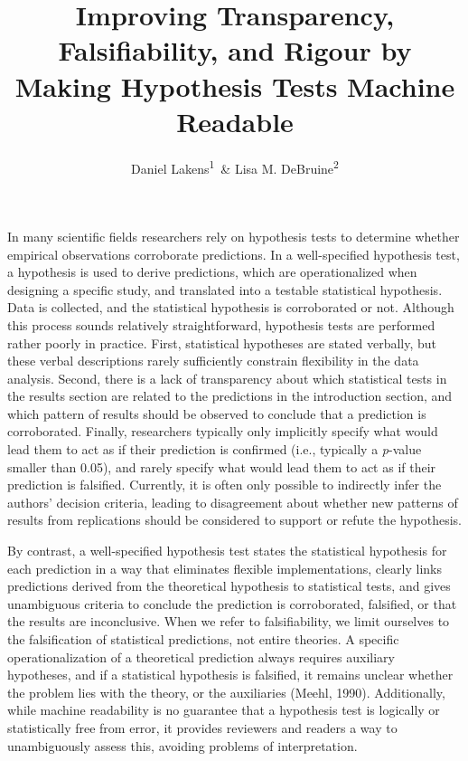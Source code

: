 \documentclass[
  english,
  doc,floatsintext]{apa6}
\author{Daniel Lakens\textsuperscript{1}\ \& Lisa M. DeBruine\textsuperscript{2}}
\affiliation{
\vspace{0.5cm}
\textsuperscript{1} School of Innovation Sciences, Eindhoven University of Technology\\\textsuperscript{2} Institute of Neuroscience and Psychology, University of Glasgow}
\title{Improving Transparency, Falsifiability, and Rigour by Making Hypothesis Tests Machine Readable}
\date{}
\begin{document}
\maketitle

In many scientific fields researchers rely on hypothesis tests to determine whether empirical observations corroborate predictions. In a well-specified hypothesis test, a hypothesis is used to derive predictions, which are operationalized when designing a specific study, and translated into a testable statistical hypothesis. Data is collected, and the statistical hypothesis is corroborated or not. Although this process sounds relatively straightforward, hypothesis tests are performed rather poorly in practice. First, statistical hypotheses are stated verbally, but these verbal descriptions rarely sufficiently constrain flexibility in the data analysis. Second, there is a lack of transparency about which statistical tests in the results section are related to the predictions in the introduction section, and which pattern of results should be observed to conclude that a prediction is corroborated. Finally, researchers typically only implicitly specify what would lead them to act as if their prediction is confirmed (i.e., typically a \emph{p}-value smaller than 0.05), and rarely specify what would lead them to act as if their prediction is falsified. Currently, it is often only possible to indirectly infer the authors' decision criteria, leading to disagreement about whether new patterns of results from replications should be considered to support or refute the hypothesis.

By contrast, a well-specified hypothesis test states the statistical hypothesis for each prediction in a way that eliminates flexible implementations, clearly links predictions derived from the theoretical hypothesis to statistical tests, and gives unambiguous criteria to conclude the prediction is corroborated, falsified, or that the results are inconclusive. When we refer to falsifiability, we limit ourselves to the falsification of statistical predictions, not entire theories. A specific operationalization of a theoretical prediction always requires auxiliary hypotheses, and if a statistical hypothesis is falsified, it remains unclear whether the problem lies with the theory, or the auxiliaries (Meehl, 1990). Additionally, while machine readability is no guarantee that a hypothesis test is logically or statistically free from error, it provides reviewers and readers a way to unambiguously assess this, avoiding problems of interpretation.
\end{document}
